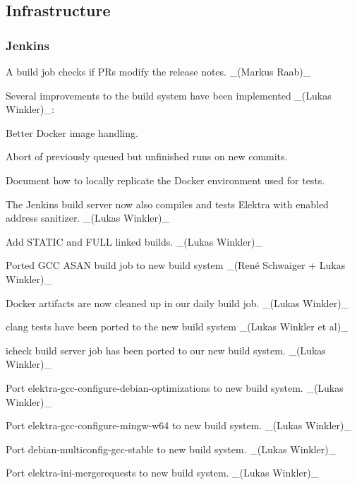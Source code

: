 \subsection*{Infrastructure}

\subsubsection*{Jenkins}


\begin{DoxyItemize}
\item A build job checks if P\+Rs modify the release notes. \+\_\+(\+Markus Raab)\+\_\+
\item Several improvements to the build system have been implemented \+\_\+(\+Lukas Winkler)\+\_\+\+:
\begin{DoxyItemize}
\item Better Docker image handling.
\item Abort of previously queued but unfinished runs on new commits.
\item Document how to locally replicate the Docker environment used for tests.
\end{DoxyItemize}
\item The Jenkins build server now also compiles and tests Elektra with enabled address sanitizer. \+\_\+(\+Lukas Winkler)\+\_\+
\item Add {\ttfamily S\+T\+A\+T\+IC} and {\ttfamily F\+U\+LL} linked builds. \+\_\+(\+Lukas Winkler)\+\_\+
\item Ported G\+CC A\+S\+AN build job to new build system \+\_\+(René Schwaiger + Lukas Winkler)\+\_\+
\item Docker artifacts are now cleaned up in our daily build job. \+\_\+(\+Lukas Winkler)\+\_\+
\item {\ttfamily clang} tests have been ported to the new build system \+\_\+(\+Lukas Winkler et al)\+\_\+
\item {\ttfamily icheck} build server job has been ported to our new build system. \+\_\+(\+Lukas Winkler)\+\_\+
\item Port {\ttfamily elektra-\/gcc-\/configure-\/debian-\/optimizations} to new build system. \+\_\+(\+Lukas Winkler)\+\_\+
\item Port {\ttfamily elektra-\/gcc-\/configure-\/mingw-\/w64} to new build system. \+\_\+(\+Lukas Winkler)\+\_\+
\item Port {\ttfamily debian-\/multiconfig-\/gcc-\/stable} to new build system. \+\_\+(\+Lukas Winkler)\+\_\+
\item Port {\ttfamily elektra-\/ini-\/mergerequests} to new build system. \+\_\+(\+Lukas Winkler)\+\_\+

\end{DoxyItemize}
